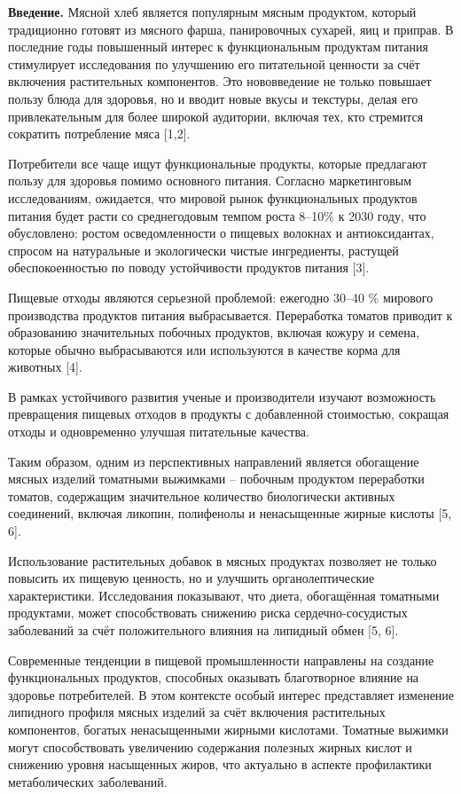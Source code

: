 \begin{multicols}{2}
{\bfseries Введение.} Мясной хлеб является популярным мясным продуктом,
который традиционно готовят из мясного фарша, панировочных сухарей, яиц
и приправ. В последние годы повышенный интерес к функциональным
продуктам питания стимулирует исследования по улучшению его питательной
ценности за счёт включения растительных компонентов. Это нововведение не
только повышает пользу блюда для здоровья, но и вводит новые вкусы и
текстуры, делая его привлекательным для более широкой аудитории, включая
тех, кто стремится сократить потребление мяса {[}1,2{]}.

Потребители все чаще ищут функциональные продукты, которые предлагают
пользу для здоровья помимо основного питания. Согласно маркетинговым
исследованиям, ожидается, что мировой рынок функциональных продуктов
питания будет расти со среднегодовым темпом роста 8--10\% к 2030 году,
что обусловлено: ростом осведомленности о пищевых волокнах и
антиоксидантах, спросом на натуральные и экологически чистые
ингредиенты, растущей обеспокоенностью по поводу устойчивости продуктов
питания {[}3{]}.

Пищевые отходы являются серьезной проблемой: ежегодно 30--40 \% мирового
производства продуктов питания выбрасывается. Переработка томатов
приводит к образованию значительных побочных продуктов, включая кожуру и
семена, которые обычно выбрасываются или используются в качестве корма
для животных {[}4{]}.

В рамках устойчивого развития ученые и производители изучают возможность
превращения пищевых отходов в продукты с добавленной стоимостью,
сокращая отходы и одновременно улучшая питательные качества.

Таким образом, одним из перспективных направлений является обогащение
мясных изделий томатными выжимками -- побочным продуктом переработки
томатов, содержащим значительное количество биологически активных
соединений, включая ликопин, полифенолы и ненасыщенные жирные кислоты
{[}5, 6{]}.

Использование растительных добавок в мясных продуктах позволяет не
только повысить их пищевую ценность, но и улучшить органолептические
характеристики. Исследования показывают, что диета, обогащённая
томатными продуктами, может способствовать снижению риска
сердечно-сосудистых заболеваний за счёт положительного влияния на
липидный обмен {[}5, 6{]}.

Современные тенденции в пищевой промышленности направлены на создание
функциональных продуктов, способных оказывать благотворное влияние на
здоровье потребителей. В этом контексте особый интерес представляет
изменение липидного профиля мясных изделий за счёт включения
растительных компонентов, богатых ненасыщенными жирными кислотами.
Томатные выжимки могут способствовать увеличению содержания полезных
жирных кислот и снижению уровня насыщенных жиров, что актуально в
аспекте профилактики метаболических заболеваний.


\end{multicols}
